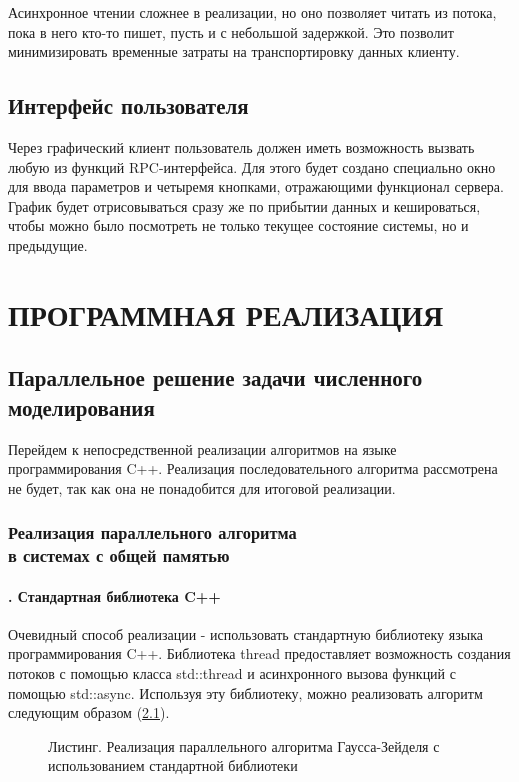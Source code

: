 \documentclass[a4paper,14pt,indentfirst]{extreport}
\begin{document}
Асинхронное чтении сложнее в реализации, но оно позволяет читать из потока, пока в него кто-то пишет, пусть и с небольшой задержкой. Это позволит минимизировать временные затраты на транспортировку данных клиенту.
\section{Интерфейс пользователя}
Через графический клиент пользователь должен иметь возможность вызвать любую из функций RPC-интерфейса. Для этого будет создано специально окно для ввода параметров и четыремя кнопками, отражающими функционал сервера. График будет отрисовываться сразу же по прибытии данных и кешироваться, чтобы можно было посмотреть не только текущее состояние системы, но и предыдущие.
\chapter{ПРОГРАММНАЯ РЕАЛИЗАЦИЯ}
\section{Параллельное решение задачи численного моделирования}
Перейдем к непосредственной реализации алгоритмов на языке программирования C++. Реализация последовательного алгоритма рассмотрена не будет, так как она не понадобится для итоговой реализации.
\subsection{Реализация параллельного алгоритма\\в системах с общей памятью}
\subsubsection*{\thesubsubsection. Стандартная библиотека C++}
Очевидный способ реализации - использовать стандартную библиотеку языка программирования C++. Библиотека thread предоставляет возможность создания потоков с помощью класса std::thread и асинхронного вызова функций с помощью std::async. Используя эту библиотеку, можно реализовать алгоритм следующим образом (\cref{thread}).

\begin{figure}[h]
  
  \caption{Листинг. Реализация параллельного алгоритма Гаусса-Зейделя с использованием стандартной библиотеки}
  \label{thread}
\end{figure}
\end{document}
